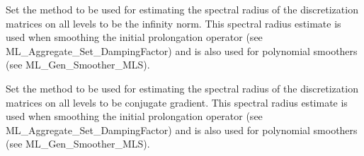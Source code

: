 
\vspace{2em}
{ \hrulefill}
\vspace{1em}

Set the method to be used for estimating the spectral 
radius of the discretization matrices on all levels
to be
the infinity norm. This spectral radius estimate is used when smoothing
the initial prolongation operator  (see ML\_Aggregate\_Set\_DampingFactor)
and is also used for polynomial smoothers
(see ML\_Gen\_Smoother\_MLS).

\vspace{2em}
{ \hrulefill}
\vspace{1em}




\vspace{2em}
{ \hrulefill}
\vspace{1em}

Set the method to be used for estimating the spectral
radius of the discretization matrices on all levels
to be
conjugate gradient. This spectral radius estimate is used when smoothing
the initial prolongation operator  (see ML\_Aggregate\_Set\_DampingFactor)
and is also used for polynomial smoothers
(see ML\_Gen\_Smoother\_MLS).

\vspace{2em}
{ \hrulefill}
\vspace{1em}


